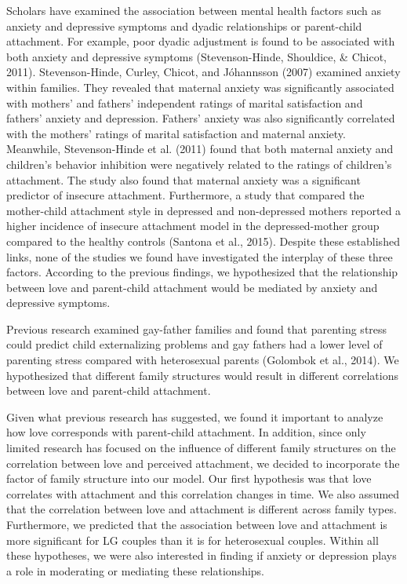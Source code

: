 \documentclass[man]{apa6}
\begin{document}
Scholars have examined the association between mental health factors such as anxiety and depressive symptoms and dyadic relationships or parent-child attachment. For example, poor dyadic adjustment is found to be associated with both anxiety and depressive symptoms (Stevenson-Hinde, Shouldice, \& Chicot, 2011). Stevenson-Hinde, Curley, Chicot, and Jóhannsson (2007) examined anxiety within families. They revealed that maternal anxiety was significantly associated with mothers' and fathers' independent ratings of marital satisfaction and fathers' anxiety and depression. Fathers' anxiety was also significantly correlated with the mothers' ratings of marital satisfaction and maternal anxiety. Meanwhile, Stevenson-Hinde et al. (2011) found that both maternal anxiety and children's behavior inhibition were negatively related to the ratings of children's attachment. The study also found that maternal anxiety was a significant predictor of insecure attachment. Furthermore, a study that compared the mother-child attachment style in depressed and non-depressed mothers reported a higher incidence of insecure attachment model in the depressed-mother group compared to the healthy controls (Santona et al., 2015). Despite these established links, none of the studies we found have investigated the interplay of these three factors. According to the previous findings, we hypothesized that the relationship between love and parent-child attachment would be mediated by anxiety and depressive symptoms.

Previous research examined gay-father families and found that parenting stress could predict child externalizing problems and gay fathers had a lower level of parenting stress compared with heterosexual parents (Golombok et al., 2014). We hypothesized that different family structures would result in different correlations between love and parent-child attachment.

Given what previous research has suggested, we found it important to analyze how love corresponds with parent-child attachment. In addition, since only limited research has focused on the influence of different family structures on the correlation between love and perceived attachment, we decided to incorporate the factor of family structure into our model. Our first hypothesis was that love correlates with attachment and this correlation changes in time. We also assumed that the correlation between love and attachment is different across family types. Furthermore, we predicted that the association between love and attachment is more significant for LG couples than it is for heterosexual couples. Within all these hypotheses, we were also interested in finding if anxiety or depression plays a role in moderating or mediating these relationships.
\end{document}
